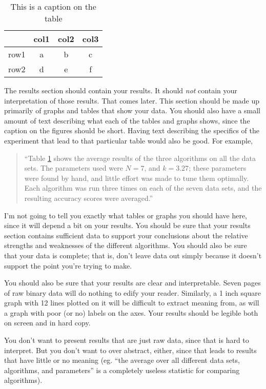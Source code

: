 \documentclass[12pt, letterpaper]{article}
\begin{document}
\begin{table}
\begin{center}
\begin{tabular}{|c||c|cc}
\hline
& col1 & col2 & col3\\
\hline \hline
row1 & a & b & c\\
\hline 
row2 & d & e & f\\
\hline 
\end{tabular}
\end{center}
\caption{This is a caption on the table}
\label{sometable}
\end{table}

The results section should contain your results.  It should \emph{not} contain
your interpretation of those results.  That comes later.  This section should be
made up primarily of graphs and tables that show your data.  You should also
have a small amount of text describing what each of the tables and graphs shows,
since the caption on the figures should be short.  Having text describing the
specifics of the experiment that lead to that particular table would also be
good.  For example,

\begin{quote}
``Table \ref{sometable} shows the average results of the three algorithms on all
the data sets.  The parameters used were $N=7$, and $k=3.27$; these parameters
were found by hand, and little effort was made to tune them optimally.  Each
algorithm was run three times on each of the seven data sets, and the resulting
accuracy scores were averaged.''
\end{quote}

I'm not going to tell you exactly what tables or graphs you should have here,
since it will depend a bit on your results.  You should be sure that your
results section contains sufficient data to support your conclusions about the
relative strengths and weaknesses of the different algorithms.  You should also
be sure that your data is complete; that is, don't leave data out simply because
it doesn't support the point you're trying to make.

You should also be sure that your results are clear and interpretable.  Seven
pages of raw binary data will do nothing to edify your reader.  Similarly, a
1 inch square graph with 12 lines plotted on it will be difficult to extract
meaning from, as will a graph with poor (or no) labels on the axes.  Your
results should be legible both on screen and in hard copy.

You don't want to present results that are just raw data, since that is hard to
interpret.  But you don't want to over abstract, either, since that leads to
results that have little or no meaning (eg. ``the average over all different
data sets, algorithms, and parameters'' is a completely useless statistic for
comparing algorithms).
\end{document}
